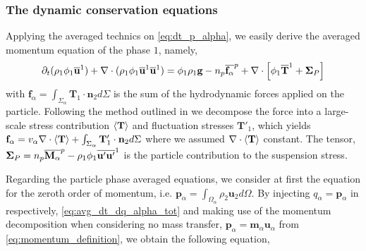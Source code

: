 \subsubsection{The dynamic conservation equations}

Applying the averaged technics on \ref{eq:dt_p_alpha}, we easily derive the averaged momentum  equation of the phase $1$, namely,
\begin{equation}
    \partial_t (\rho_1\phi_1\overline{\textbf{u}}^1)
    +  \mathbf{\nabla} \cdot (\rho_1\phi_1\overline{\textbf{u}}^1 \overline{\textbf{u}}^1)
    = 
     \phi_1 \rho_1 \textbf{g}
    - n_p\overline{\textbf{f}_\alpha}^{p}
    +  \mathbf{\nabla} \cdot \left[
        \phi_1\overline{ \textbf{T}}^1
        + \mathbf{\Sigma}_P
    \right]
    \label{eq:hybrid_avg_dt_rhou}
\end{equation}
with $\textbf{f}_\alpha = \int_{\Sigma_\alpha} \mathbf{T}_1 \cdot \textbf{n}_2d\Sigma$ is the sum of the hydrodynamic forces applied on the particle. 
Following the method outlined in \citet{chu2016flux} we decompose the force into a large-scale stress contribution $\left<\textbf{T}\right>$ and fluctuation stresses $\textbf{T}'_1$, which yields $\textbf{f}_\alpha = v_\alpha \mathbf{\nabla} \cdot\left<\textbf{T}\right>+ \int_{\Sigma_\alpha} \mathbf{T}'_1 \cdot \textbf{n}_2d\Sigma$ where we assumed $\mathbf{\nabla}\cdot\left<\textbf{T}\right>$ constant. 
The tensor, $\mathbf{\Sigma}_P = n_p\overline{\textbf{M}_\alpha}^{p} -  \rho_1\phi_1\overline{\textbf{u}'\textbf{u}'}^1$ is the particle contribution to the suspension stress.

Regarding the particle phase averaged equations, we consider at first the equation for the zeroth order of momentum, i.e. $\textbf{p}_\alpha = \int_{\Omega_\alpha} \rho_2 \textbf{u}_2 d\Omega$. 
By injecting $q_\alpha = \textbf{p}_\alpha$ in respectively, \ref{eq:avg_dt_dq_alpha_tot} and making use of the momentum decomposition when considering no mass transfer, $\textbf{p}_\alpha = \textbf{m}_\alpha \textbf{u}_\alpha$ from \ref{eq:momentum_definition},  
we obtain the following equation,

